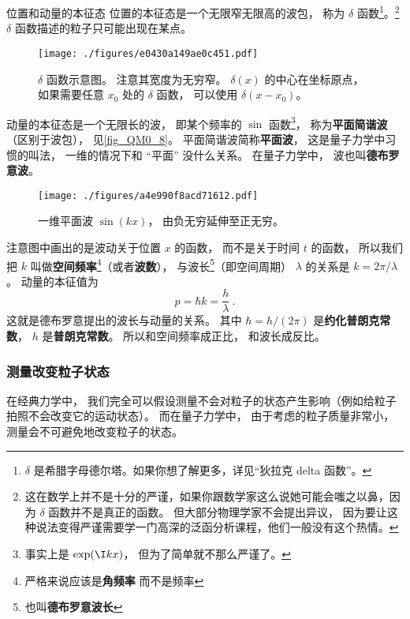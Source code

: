 \begin{example}{位置和动量的本征态}
位置的本征态是一个无限窄无限高的波包， 称为 $\delta$ 函数\footnote{$\delta$ 是希腊字母德尔塔。如果你想了解更多，详见“狄拉克 delta 函数”。}。\footnote{这在数学上并不是十分的严谨，如果你跟数学家这么说她可能会嗤之以鼻，因为 $\delta$ 函数并不是真正的函数。 但大部分物理学家不会提出异议， 因为要让这种说法变得严谨需要学一门高深的泛函分析课程，他们一般没有这个热情。} $\delta$ 函数描述的粒子只可能出现在某点。 
\begin{figure}[ht]
\centering
\texttt{[image: ./figures/e0430a149ae0c451.pdf]}
\caption{$\delta$ 函数示意图。 注意其宽度为无穷窄。 $\delta(x)$ 的中心在坐标原点， 如果需要任意 $x_0$ 处的 $\delta$ 函数， 可以使用 $\delta(x - x_0)$。} \label{fig_QM0_9} %
\end{figure}

动量的本征态是一个无限长的波， 即某个频率的 $\sin$ 函数\footnote{事实上是 $\exp(\I kx)$， 但为了简单就不那么严谨了。}， 称为\textbf{平面简谐波}（区别于波包）， 见\autoref{fig_QM0_8}。 平面简谐波简称\textbf{平面波}， 这是量子力学中习惯的叫法， 一维的情况下和 “平面” 没什么关系。 在量子力学中， 波也叫\textbf{德布罗意波}。

\begin{figure}[ht]
\centering
\texttt{[image: ./figures/a4e990f8acd71612.pdf]}
\caption{一维平面波 $\sin(kx)$， 由负无穷延伸至正无穷。} \label{fig_QM0_8}
\end{figure}

注意图中画出的是波动关于位置 $x$ 的函数， 而不是关于时间 $t$ 的函数， 所以我们把 $k$ 叫做\textbf{空间频率}\footnote{严格来说应该是\textbf{角频率} 而不是频率}（或者\textbf{波数}）， %
与波长\footnote{也叫\textbf{德布罗意波长}}（即空间周期） $\lambda$ 的关系是 $k = 2\pi/\lambda$。 动量的本征值为
\begin{equation}\label{eq_QM0_1}
p = \hbar k = \frac{h}{\lambda}~.
\end{equation}
这就是德布罗意提出的波长与动量的关系。 其中 $\hbar = h / (2\pi)$ 是\textbf{约化普朗克常数}， $h$ 是\textbf{普朗克常数}。 所以和空间频率成正比， 和波长成反比。
\end{example}

\subsubsection{测量改变粒子状态}
在经典力学中， 我们完全可以假设测量不会对粒子的状态产生影响（例如给粒子拍照不会改变它的运动状态）。 而在量子力学中， 由于考虑的粒子质量非常小， 测量会不可避免地改变粒子的状态。

